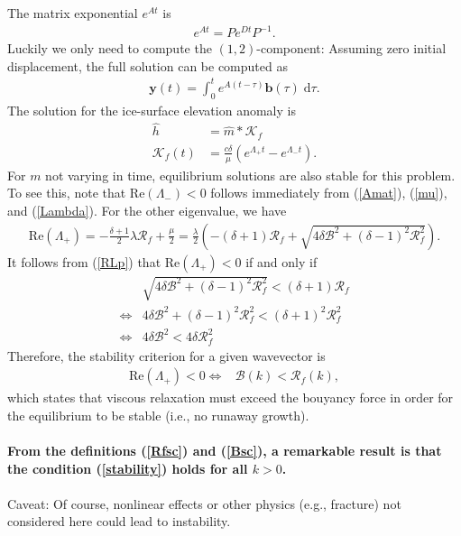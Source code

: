 \documentclass[paper=a4, fontsize=11pt]{article}
\begin{document}
The matrix exponential $e^{{A}t}$ is
\begin{align}
e^{{A}t} = {P}e^{{D}t}{P}^{-1}.
\end{align}
Luckily we only need to compute the $(1,2)$-component:
Assuming zero initial displacement, the full solution can be computed as
\begin{align}
\pmb{y}(t) = \int_0^t e^{{A}(t-\tau)} \pmb{b}(\tau)\;\mathrm{d}\tau. \label{ysol}
\end{align}
The solution for the ice-surface elevation anomaly is
\begin{align}
\widehat{h} &= \widehat{m} * \mathcal{K}_f\\
\mathcal{K}_f(t)  &=  \frac{c\delta}{\mu}(e^{\Lambda_+ t}-e^{\Lambda_-t}).
\end{align}
For $m$ not varying in time, equilibrium solutions are also stable for this problem.
To see this, note that $\mathrm{Re}(\Lambda_-)<0$ follows immediately
from (\ref{Amat}), (\ref{mu}), and (\ref{Lambda}).
For the other eigenvalue, we have
\begin{align}
\mathrm{Re}(\Lambda_+) = -\frac{\delta+1}{2}\lambda\mathcal{R}_f + \frac{\mu}{2}
= \frac{\lambda}{2}\left(-(\delta+1)\mathcal{R}_f+\sqrt{4\delta\mathcal{B}^2 + (\delta-1)^2\mathcal{R}_f^2 } \right). \label{RLp}
\end{align}
It follows from (\ref{RLp}) that $\mathrm{Re}(\Lambda_+)<0$ if and only if
\begin{align}
&\sqrt{4\delta\mathcal{B}^2 + (\delta-1)^2\mathcal{R}_f^2 } < (\delta+1)\mathcal{R}_f \\
\iff &4\delta\mathcal{B}^2 + (\delta-1)^2\mathcal{R}_f^2 < (\delta+1)^2 \mathcal{R}_f^2 \\
\iff &4\delta\mathcal{B}^2 < 4\delta \mathcal{R}_f^2
\end{align}
Therefore, the stability criterion for a given wavevector is
\begin{align}
\mathrm{Re}(\Lambda_+)<0  \iff &\mathcal{B}(k) < \mathcal{R}_f(k), \label{stability}
\end{align}
which states that viscous relaxation must exceed the bouyancy force
in order for the equilibrium to be stable (i.e., no runaway growth). \\ \\
\textbf{From the definitions (\ref{Rfsc}) and (\ref{Bsc}), a remarkable result is that
the condition (\ref{stability}) holds for all $k>0$.}
\\ \\
Caveat: Of course, nonlinear
effects or other physics (e.g., fracture) not considered here could lead to instability.
\end{document}
